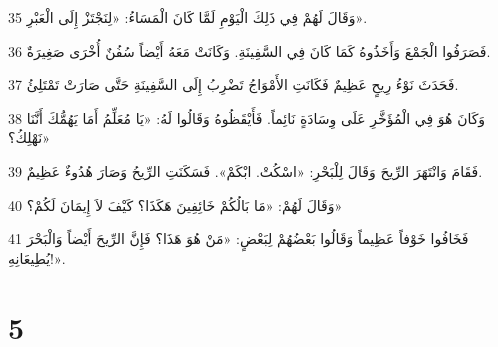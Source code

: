 \par 35 وَقَالَ لَهُمْ فِي ذَلِكَ الْيَوْمِ لَمَّا كَانَ الْمَسَاءُ: «لِنَجْتَزْ إِلَى الْعَبْرِ».
\par 36 فَصَرَفُوا الْجَمْعَ وَأَخَذُوهُ كَمَا كَانَ فِي السَّفِينَةِ. وَكَانَتْ مَعَهُ أَيْضاً سُفُنٌ أُخْرَى صَغِيرَةٌ.
\par 37 فَحَدَثَ نَوْءُ رِيحٍ عَظِيمٌ فَكَانَتِ الأَمْوَاجُ تَضْرِبُ إِلَى السَّفِينَةِ حَتَّى صَارَتْ تَمْتَلِئُ.
\par 38 وَكَانَ هُوَ فِي الْمُؤَخَّرِ عَلَى وِسَادَةٍ نَائِماً. فَأَيْقَظُوهُ وَقَالُوا لَهُ: «يَا مُعَلِّمُ أَمَا يَهُمُّكَ أَنَّنَا نَهْلِكُ؟»
\par 39 فَقَامَ وَانْتَهَرَ الرِّيحَ وَقَالَ لِلْبَحْرِ: «اسْكُتْ. ابْكَمْ». فَسَكَنَتِ الرِّيحُ وَصَارَ هُدُوءٌ عَظِيمٌ.
\par 40 وَقَالَ لَهُمْ: «مَا بَالُكُمْ خَائِفِينَ هَكَذَا؟ كَيْفَ لاَ إِيمَانَ لَكُمْ؟»
\par 41 فَخَافُوا خَوْفاً عَظِيماً وَقَالُوا بَعْضُهُمْ لِبَعْضٍ: «مَنْ هُوَ هَذَا؟ فَإِنَّ الرِّيحَ أَيْضاً وَالْبَحْرَ يُطِيعَانِهِ!».

\chapter{5}


